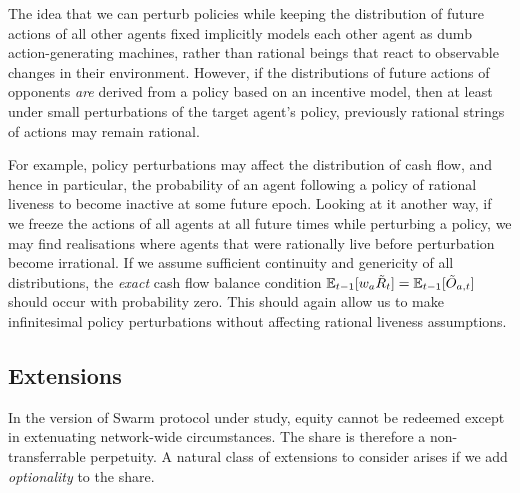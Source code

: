\begin{remark}

  The idea that we can perturb policies while keeping the distribution of future actions of all other agents fixed implicitly models each other agent as dumb action-generating machines, rather than rational beings that react to observable changes in their environment.
  However, if the distributions of future actions of opponents \emph{are} derived from a policy based on an incentive model, then at least under small perturbations of the target agent's policy, previously rational strings of actions may remain rational.

  For example, policy perturbations may affect the distribution of cash flow, and hence in particular, the probability of an agent following a policy of rational liveness to become inactive at some future epoch.
  Looking at it another way, if we freeze the actions of all agents at all future times while perturbing a policy, we may find realisations where agents that were rationally live before perturbation become irrational.
  If we assume sufficient continuity and genericity of all distributions, the \emph{exact} cash flow balance condition $\mathbb{E}_{t-1}[w_a\tilde R_t]=\mathbb{E}_{t-1}[\tilde O_{a,t}]$ should occur with probability zero.
  This should again allow us to make infinitesimal policy perturbations without affecting rational liveness assumptions.

\end{remark}


\subsection{Extensions}
\label{section:extensions}

In the version of Swarm protocol under study, equity cannot be redeemed except in extenuating network-wide circumstances.
%
The share is therefore a non-transferrable perpetuity.
%
A natural class of extensions to consider arises if we add \emph{optionality} to the share.

